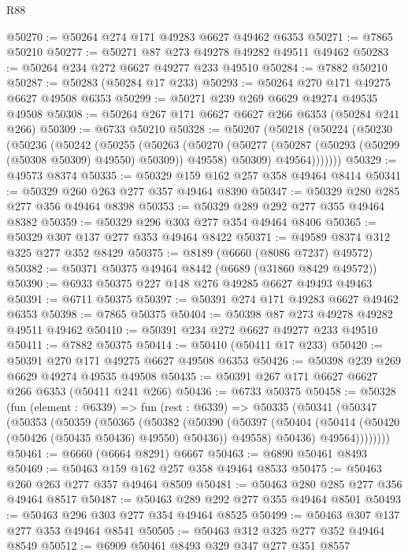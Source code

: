 \begin{lexlean}{R88}
\begin{coremodule}
@50270 := @50264 @274 @171 @49283 @6627 @49462 @6353
@50271 := @7865 @50210
@50277 := @50271 @87 @273 @49278 @49282 @49511 @49462
@50283 := @50264 @234 @272 @6627 @49277 @233 @49510
@50284 := @7882 @50210
@50287 := @50283 (@50284 @17 @233)
@50293 := @50264 @270 @171 @49275 @6627 @49508 @6353
@50299 := @50271 @239 @269 @6629 @49274 @49535 @49508
@50308 := @50264 @267 @171 @6627 @6627 @266 @6353 (@50284 @241 @266)
@50309 := @6733 @50210
@50328 := @50207
    (@50218
      (@50224
        (@50230
          (@50236
            (@50242
              (@50255
                (@50263
                  (@50270
                    (@50277 (@50287 (@50293 (@50299 (@50308 @50309) @49550) @50309)) @49558)
                    @50309)
                  @49564)))))))
@50329 := @49573 @8374
@50335 := @50329 @159 @162 @257 @358 @49464 @8414
@50341 := @50329 @260 @263 @277 @357 @49464 @8390
@50347 := @50329 @280 @285 @277 @356 @49464 @8398
@50353 := @50329 @289 @292 @277 @355 @49464 @8382
@50359 := @50329 @296 @303 @277 @354 @49464 @8406
@50365 := @50329 @307 @137 @277 @353 @49464 @8422
@50371 := @49589 @8374 @312 @325 @277 @352 @8429
@50375 := @8189 (@6660 (@8086 @7237) @49572)
@50382 := @50371 @50375 @49464 @8442 (@6689 (@31860 @8429 @49572))
@50390 := @6933 @50375 @227 @148 @276 @49285 @6627 @49493 @49463
@50391 := @6711 @50375
@50397 := @50391 @274 @171 @49283 @6627 @49462 @6353
@50398 := @7865 @50375
@50404 := @50398 @87 @273 @49278 @49282 @49511 @49462
@50410 := @50391 @234 @272 @6627 @49277 @233 @49510
@50411 := @7882 @50375
@50414 := @50410 (@50411 @17 @233)
@50420 := @50391 @270 @171 @49275 @6627 @49508 @6353
@50426 := @50398 @239 @269 @6629 @49274 @49535 @49508
@50435 := @50391 @267 @171 @6627 @6627 @266 @6353 (@50411 @241 @266)
@50436 := @6733 @50375
@50458 := @50328
    (fun (element : @6339) =>
    fun (rest : @6339) =>
    @50335
      (@50341
        (@50347
          (@50353
            (@50359
              (@50365
                (@50382
                  (@50390
                    (@50397
                      (@50404 (@50414 (@50420 (@50426 (@50435 @50436) @49550) @50436)) @49558)
                      @50436)
                    @49564))))))))
@50461 := @6660 (@6664 @8291) @6667
@50463 := @6890 @50461 @8493
@50469 := @50463 @159 @162 @257 @358 @49464 @8533
@50475 := @50463 @260 @263 @277 @357 @49464 @8509
@50481 := @50463 @280 @285 @277 @356 @49464 @8517
@50487 := @50463 @289 @292 @277 @355 @49464 @8501
@50493 := @50463 @296 @303 @277 @354 @49464 @8525
@50499 := @50463 @307 @137 @277 @353 @49464 @8541
@50505 := @50463 @312 @325 @277 @352 @49464 @8549
@50512 := @6909 @50461 @8493 @329 @347 @277 @351 @8557

\end{coremodule}
\end{lexlean}
